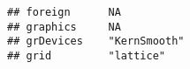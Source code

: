 \documentclass[]{book}
\begin{document}
\begin{verbatim}
## foreign      NA                                                                                                                                                                                                                                                                                                                                                                                                                                                                                                                                                                                                                                                                                                        
## graphics     NA                                                                                                                                                                                                                                                                                                                                                                                                                                                                                                                                                                                                                                                                                                        
## grDevices    "KernSmooth"                                                                                                                                                                                                                                                                                                                                                                                                                                                                                                                                                                                                                                                                                              
## grid         "lattice"                                                                                                                                                                                                                                                                                                                                                                                                                                                                                                                                                                                                                                                                                                 

\end{verbatim}
\end{document}
